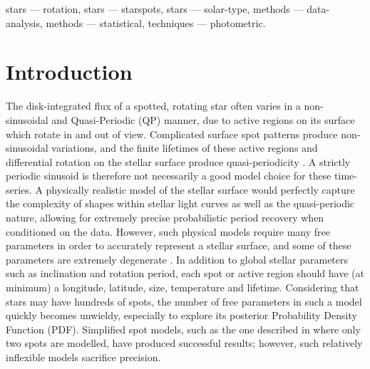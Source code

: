 \documentclass[a4paper,fleqn,usenatbib,useAMS]{mnras}
\newcommand{\eg}{{\it e.g.}}
\begin{document}
\begin{keywords}
    stars --- rotation,
    stars --- starspots,
    stars --- solar-type,
    methods --- data-analysis,
    methods --- statistical,
    techniques --- photometric.
\end{keywords}


\section{Introduction}
\label{sec:intro}

The disk-integrated flux of a spotted, rotating star often varies in a
non-sinusoidal and Quasi-Periodic (QP) manner, due to active regions on its
surface which rotate in and out of view.
Complicated surface spot patterns produce non-sinusoidal variations, and the
finite lifetimes of these active regions and differential rotation on the
stellar surface produce quasi-periodicity \citep{Dumusque2011}.
A strictly periodic sinusoid is therefore not necessarily a good model choice
for these time-series.
A physically realistic model of the stellar surface
would perfectly capture the complexity of shapes
within stellar light curves as well as the quasi-periodic nature, allowing for
extremely precise probabilistic period recovery when conditioned on the data.
However, such physical models require many free parameters in order to
accurately represent a stellar surface, and some of these parameters are
extremely degenerate \citep[\eg][]{Russell1906, Jeffers2009, Kipping2012}.
In addition to global stellar parameters such as inclination and rotation
period, each spot or active region should have (at minimum) a longitude,
latitude, size, temperature and lifetime.
Considering that stars may have hundreds of spots, the number of free
parameters in such a model quickly becomes unwieldy, especially to explore its
posterior Probability Density Function (PDF).
Simplified spot models, such as the one described in \citet{Lanza2014} where
only two spots are modelled, have produced successful results; however, such
relatively inflexible models sacrifice precision.
\end{document}
